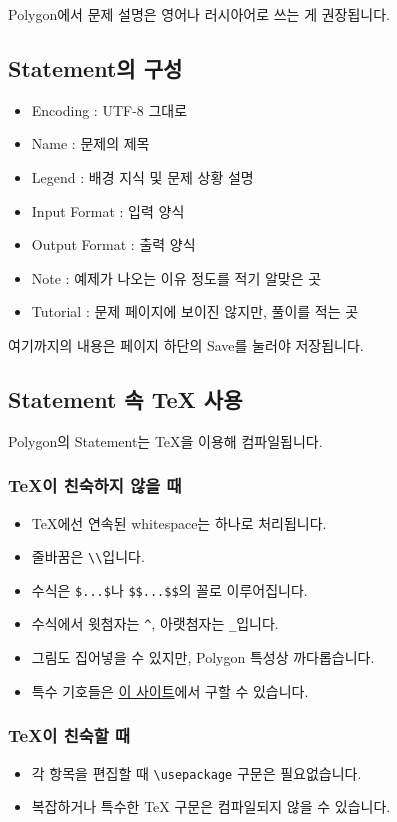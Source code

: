 \documentclass{article}
\begin{document}
    Polygon에서 문제 설명은 영어나 러시아어로 쓰는 게 권장됩니다.
    \subsection{Statement의 구성}
    \begin{itemize}
        \item Encoding : UTF-8 그대로
        \item Name : 문제의 제목
        \item Legend : 배경 지식 및 문제 상황 설명
        \item Input Format : 입력 양식
        \item Output Format : 출력 양식
        \item Note : 예제가 나오는 이유 정도를 적기 알맞은 곳
        \item Tutorial : 문제 페이지에 보이진 않지만, 풀이를 적는 곳
    \end{itemize}
    여기까지의 내용은 페이지 하단의 Save를 눌러야 저장됩니다.
    \subsection{Statement 속 TeX 사용}
    Polygon의 Statement는 TeX을 이용해 컴파일됩니다.
    \subsubsection{TeX이 친숙하지 않을 때}
    \begin{itemize}
        \item TeX에선 연속된 whitespace는 하나로 처리됩니다.
        \item 줄바꿈은 \verb|\\|입니다.
        \item 수식은 \verb|$...$|나 \verb|$$...$$|의 꼴로 이루어집니다.
        \item 수식에서 윗첨자는 \verb|^|, 아랫첨자는 \verb|_|입니다.
        \item 그림도 집어넣을 수 있지만, Polygon 특성상 까다롭습니다.
        \item 특수 기호들은 {\color{blue}\href{http://detexify.kirelabs.org/classify.html}{이 사이트}}에서 구할 수 있습니다.
    \end{itemize}
    \subsubsection{TeX이 친숙할 때}
    \begin{itemize}
        \item 각 항목을 편집할 때 \verb|\usepackage| 구문은 필요없습니다.
        \item 복잡하거나 특수한 TeX 구문은 컴파일되지 않을 수 있습니다.
    \end{itemize}
\end{document}
